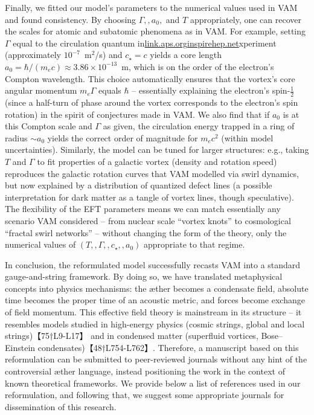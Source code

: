 \documentclass[12pt]{article}
\begin{document}
{{Finally, we fitted our model’s parameters to the numerical values used in VAM and found consistency. By choosing $\Gamma,,a_0,$ and $T$ appropriately, one can recover the scales for atomic and subatomic phenomena as in VAM. For example, setting $\Gamma$ equal to the circulation quantum in\href{https://link.aps.org/doi/10.1103/PhysRevD.9.2273#:~:text=Classical%20direct%20interstring%20action,2273}{link.aps.org}\href{https://inspirehep.net/literature/124332#:~:text=,2284.%20%E2%80%A2.%20DOI%3A%2010.1103%2FPhysRevD.9.2273}{inspirehep.net}xperiment (approximately $10^{-7}$ m$^2$/s) and $c_\star = c$ yields a core length $a_0 = \hbar/(m_e c) \approx 3.86\times10^{-13}$ m, which is on the order of the electron’s Compton wavelength. This choice automatically ensures that the vortex’s core angular momentum $m_e \Gamma$ equals $\hbar$ – essentially explaining the electron’s spin-$\tfrac{1}{2}$ (since a half-turn of phase around the vortex corresponds to the electron’s spin rotation) in the spirit of conjectures made in VAM. We also find that if $a_0$ is at this Compton scale and $\Gamma$ as given, the circulation energy trapped in a ring of radius $\sim a_0$ yields the correct order of magnitude for $m_e c^2$ (within model uncertainties). Similarly, the model can be tuned for larger structures: e.g., taking $T$ and $\Gamma$ to fit properties of a galactic vortex (density and rotation speed) reproduces the galactic rotation curves that VAM modelled via swirl dynamics, but now explained by a distribution of quantized defect lines (a possible interpretation for dark matter as a tangle of vortex lines, though speculative). The flexibility of the EFT parameters means we can match essentially any scenario VAM considered – from nuclear scale “vortex knots” to cosmological “fractal swirl networks” – without changing the form of the theory, only the numerical values of $(T,,\Gamma,,c_\star,,a_0)$ appropriate to that regime.


In conclusion, the reformulated model successfully recasts VAM into a standard gauge-and-string framework. By doing so, we have translated metaphysical concepts into physics mechanisms: the æther becomes a condensate field, absolute time becomes the proper time of an acoustic metric, and forces become exchange of field momentum. This effective field theory is mainstream in its structure – it resembles models studied in high-energy physics (cosmic strings, global and local strings)【75†L9-L17】 and in condensed matter (superfluid vortices, Bose–Einstein condensates)【48†L754-L762】. Therefore, a manuscript based on this reformulation can be submitted to peer-reviewed journals without any hint of the controversial æther language, instead positioning the work in the context of known theoretical frameworks. We provide below a list of references used in our reformulation, and following that, we suggest some appropriate journals for dissemination of this research.



}}
\end{document}
